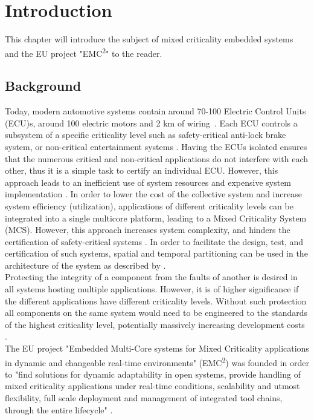 \chapter{Introduction}
\label{sec:introduction}
This chapter will introduce the subject of mixed criticality embedded systems and the EU project "EMC\textsuperscript{2}" to the reader.

\section{Background}
Today, modern automotive systems contain around 70-100 Electric Control Units (ECU)s, around 100 electric motors and 2 km of wiring~\cite{thompson2012}. Each ECU controls a subsystem of a specific criticality level such as safety-critical anti-lock brake system, or non-critical entertainment systems \cite{weber2015}. Having the ECUs isolated ensures that the numerous critical and non-critical applications do not interfere with each other, thus it is a simple task to certify an individual ECU. However, this approach leads to an inefficient use of system resources and expensive system implementation \cite{burns2016}. In order to lower the cost of the collective system and increase system efficiency (utilization), applications of different criticality levels can be integrated into a single multicore platform, leading to a Mixed Criticality System (MCS). However, this approach increases system complexity, and hinders the certification of safety-critical systems \cite{zaki2016}. %
In order to facilitate the design, test, and certification of such systems, spatial and temporal partitioning can be used in the architecture of the system as described by \cite{zaki2016}.\\

Protecting the integrity of a component from the faults of another is desired in all systems hosting multiple applications. However, it is of higher significance if the different applications have different criticality levels. Without such protection all components on the same system would need to be engineered to the standards of the highest criticality level, potentially massively increasing development costs \cite{burns2016}.\\

The EU project "Embedded Multi-Core systems for Mixed Criticality applications in dynamic and changeable real-time environments" (EMC\textsuperscript{2}) was founded in order to "find solutions for dynamic adaptability in open systems, provide handling of mixed criticality applications under real-time conditions, scalability and utmost flexibility, full scale deployment and management of integrated tool chains, through the entire lifecycle" \cite{weber2015}. 

